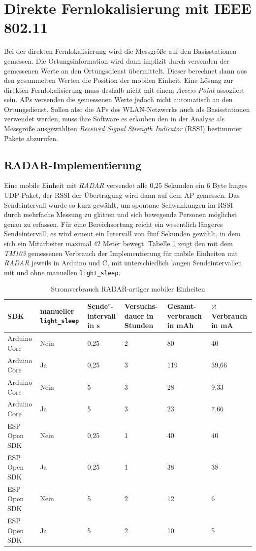 \section{Direkte Fernlokalisierung mit IEEE 802.11}
\label{ch:phase2}
Bei der direkten Fernlokalisierung wird die Messgröße auf den Basisstationen gemessen.
Die Ortungsinformation wird dann implizit durch versenden der gemessenen Werte an den Ortungsdienst übermittelt.
Dieser berechnet dann aus den gesammelten Werten die Position der mobilen Einheit.
Eine Lösung zur direkten Fernlokalisierung muss deshalb nicht mit einem \emph{Access Point} assoziiert sein.
APs versenden die gemessenen Werte jedoch nicht automatisch an den Ortungsdienst. 
Sollen also die APs des WLAN-Netzwerks auch als Basisstationen verwendet werden, muss ihre Software es erlauben den in der Analyse als Messgröße ausgewählten \emph{Received Signal Strength Indicator} (RSSI) bestimmter Pakete abzurufen.

\subsection{RADAR-Implementierung}
Eine mobile Einheit mit \emph{RADAR} versendet alle 0,25 Sekunden ein 6 Byte langes UDP-Paket, der RSSI der Übertragung wird dann auf dem AP gemessen.
Das Sendeintervall wurde so kurz gewählt, um spontane Schwankungen im RSSI durch mehrfache Messung zu glätten und sich bewegende Personen möglichst genau zu erfassen.
Für eine Bereichsortung reicht ein wesentlich längeres Sendeintervall, es wird erneut ein Intervall von fünf Sekunden gewählt, in dem sich ein Mitarbeiter maximal 42 Meter bewegt. 
Tabelle \ref{table:radarconsumption} zeigt den mit dem \emph{TM103} gemessenen Verbrauch der Implementierung für mobile Einheiten mit \emph{RADAR} jeweils in Arduino und C, mit unterschiedlich langen Sendeintervallen mit und ohne manuellen \texttt{light\_sleep}.

\begin{table}[h]
	\centering
	\caption{Stromverbrauch RADAR-artiger mobiler Einheiten}
	\label{table:radarconsumption}
	\begin{tabular}{l|p{2.2cm}|p{1.5cm}|p{2cm}|p{2cm}|p{2cm}}
		SDK & manueller \texttt{light\_sleep} & Sende"-intervall in s & Versuchs-dauer in Stunden & Gesamt-verbrauch in mAh & $\varnothing$ Verbrauch in mA \\
		\hline
		Arduino Core & Nein & 0,25 & 2 & 80 & 40 \\
		Arduino Core & Ja & 0,25 & 3 & 119 & 39,66 \\
		Arduino Core & Nein & 5 & 3 & 28 & 9,33 \\
		Arduino Core & Ja & 5 & 3 & 23 & 7,66 \\
		ESP Open SDK & Nein & 0,25 & 1 & 40 & 40 \\
		ESP Open SDK & Ja & 0,25 & 1 & 38 & 38 \\
		ESP Open SDK & Nein & 5 & 2 & 12 & 6 \\
		ESP Open SDK & Ja & 5 & 2 & 10 & 5 \\
	\end{tabular}
\end{table}


